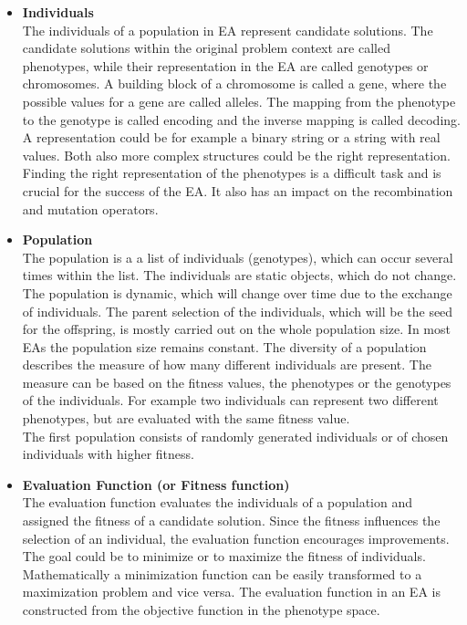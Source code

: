    \begin{itemize}
        
        \item \textbf{Individuals}\\
        The individuals of a population in EA represent candidate solutions. The candidate solutions within the original problem context are called phenotypes, while their representation in the EA are called genotypes or chromosomes. A building block of a chromosome is called a gene, where the possible values for a gene are called alleles. The mapping from the phenotype to the genotype is called encoding and the inverse mapping is called decoding. A representation could be for example a binary string or a string with real values. Both also more complex structures could be the right representation. Finding the right representation of the phenotypes is a difficult task and is crucial for the success of the EA. It also has an impact on the recombination and mutation operators.
        
        \item \textbf{Population}\\
        The population is a a list of individuals (genotypes), which can occur several times within the list. The individuals are static objects, which do not change. The population is dynamic, which will change over time due to the exchange of individuals. The parent selection of the individuals, which will be the seed for the offspring, is mostly carried out on the whole population size. In most EAs the population size remains constant. The diversity of a population describes the measure of how many different individuals are present. The measure can be based on the fitness values, the phenotypes or the genotypes of the individuals. For example two individuals can represent two different phenotypes, but are evaluated with the same fitness value.\\
        The first population consists of randomly generated individuals or of chosen individuals with higher fitness.
        
        \item \textbf{Evaluation Function (or Fitness function)}\\
        The evaluation function evaluates the individuals of a population and assigned the fitness of a candidate solution. Since the fitness influences the selection of an individual, the evaluation function encourages improvements. The goal could be to minimize or to maximize the fitness of individuals. Mathematically a minimization function can be easily transformed to a maximization problem and vice versa. The evaluation function in an EA is constructed from the objective function in the phenotype space.
        

\end{itemize}

